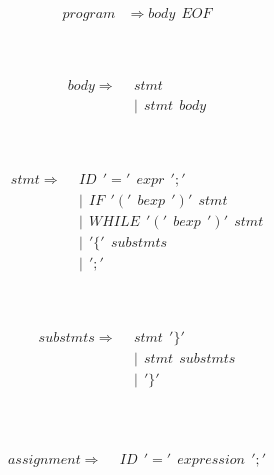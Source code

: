 \documentclass[12pt, letterpaper]{article}
\begin{document}
\newpage


	\begin{equation} \label{eq_2_1}
		\begin{aligned}
			program &\Rightarrow body\ \  EOF
		\end{aligned}
	\end{equation}
	
	\hfill\\\hfill\\
	\begin{equation} \label{eq_2_1}
		\begin{aligned}
			body \Rightarrow\ \ &stmt \\
				&|\ \ stmt\ \ body
		\end{aligned}
	\end{equation}
	
	
	
	\hfill\\\hfill\\ 
	\begin{equation} \label{eq_2_1}
		\begin{aligned}
			stmt \Rightarrow\ \ &ID\ \ '=' \ \ expr \ \ ';'\\
				&|\ \ IF\ \ '('\ \ bexp \ \ ')' \ \ stmt\\
				&|\ \ WHILE\  \ '('\ \ bexp \ \ ')' \ \ stmt\\
				&| \ \  '\{' \ \ substmts\\
				&|\ \ ';'
		\end{aligned}
	\end{equation}
	
	
	
	
	\hfill\\\hfill\\
	\begin{equation} \label{eq_2_1}
		\begin{aligned}
			substmts \Rightarrow\ \ &stmt\ \ '\}'\\
				&|\ \ stmt\ \ substmts\\
				&|\ \  '\}'\\
		\end{aligned}
	\end{equation}
	
	
	\hfill\\\hfill\\
	\begin{equation} \label{eq_2_1}
		\begin{aligned}
			assignment \Rightarrow\ \ &ID\ \ '='\ \ expression\ \ ';'\\
		\end{aligned}
	\end{equation}
	
\end{document}
